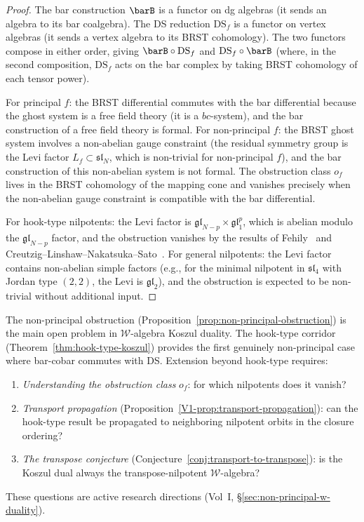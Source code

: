\begin{proof}
The bar construction $\barB$ is a functor on dg algebras
(it sends an algebra to its bar coalgebra). The DS
reduction $\mathrm{DS}_f$ is a functor on vertex algebras
(it sends a vertex algebra to its BRST cohomology). The
two functors compose in either order, giving
$\barB\circ\mathrm{DS}_f$ and $\mathrm{DS}_f\circ\barB$
(where, in the second composition, $\mathrm{DS}_f$ acts
on the bar complex by taking BRST cohomology of each
tensor power).

For principal $f$: the BRST differential commutes with
the bar differential because the ghost system is a free
field theory (it is a $bc$-system), and the bar
construction of a free field theory is formal. For
non-principal $f$: the BRST ghost system involves a
non-abelian gauge constraint (the residual symmetry
group is the Levi factor $L_f\subset\mathfrak{sl}_N$,
which is non-trivial for non-principal $f$), and the
bar construction of this non-abelian system is not formal.
The obstruction class $o_f$ lives in the BRST cohomology
of the mapping cone and vanishes precisely when the
non-abelian gauge constraint is compatible with the
bar differential.

For hook-type nilpotents: the Levi factor is
$\mathfrak{gl}_{N-p}\times\mathfrak{gl}_1^p$, which is
abelian modulo the $\mathfrak{gl}_{N-p}$ factor, and the
obstruction vanishes by the results of
Fehily~\cite{Feh23} and
Creutzig--Linshaw--Nakatsuka--Sato~\cite{CLNS24}.
For general nilpotents: the Levi factor contains
non-abelian simple factors (e.g., for the minimal nilpotent
in $\mathfrak{sl}_4$ with Jordan type $(2,2)$, the Levi
is $\mathfrak{gl}_2$), and the obstruction is expected to
be non-trivial without additional input.
\end{proof}

\begin{remark}
The non-principal obstruction
(Proposition~\ref{prop:non-principal-obstruction}) is the
main open problem in $\mathcal{W}$-algebra Koszul duality.
The hook-type corridor
(Theorem~\ref{thm:hook-type-koszul}) provides the first
genuinely non-principal case where bar-cobar commutes with
DS. Extension beyond hook-type requires:
\begin{enumerate}[label=(\roman*)]
\item \emph{Understanding the obstruction class} $o_f$:
 for which nilpotents does it vanish?
\item \emph{Transport propagation}
 (Proposition~\ref{V1-prop:transport-propagation}):
 can the hook-type result be propagated to neighboring
 nilpotent orbits in the closure ordering?
\item \emph{The transpose conjecture}
 (Conjecture~\ref{conj:transport-to-transpose}):
 is the Koszul dual always the transpose-nilpotent
 $\mathcal{W}$-algebra?
\end{enumerate}
These questions are active research directions
(Vol~I, \S\ref*{sec:non-principal-w-duality}).
\end{remark}

